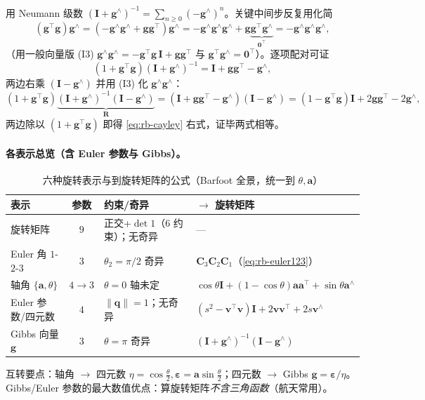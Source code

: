 \begin{derivation}
用 Neumann 级数 $(\mathbf{I}+\mathbf{g}^\wedge)^{-1}=\sum_{n\ge0}(-\mathbf{g}^\wedge)^n$。关键中间步反复用化简
\[
  (\mathbf{g}^\top\mathbf{g})\mathbf{g}^\wedge=(-\mathbf{g}^\wedge\mathbf{g}^\wedge+\mathbf{g}\mathbf{g}^\top)\mathbf{g}^\wedge
  =-\mathbf{g}^\wedge\mathbf{g}^\wedge\mathbf{g}^\wedge+\mathbf{g}\underbrace{\mathbf{g}^\top\mathbf{g}^\wedge}_{\mathbf{0}^\top}=-\mathbf{g}^\wedge\mathbf{g}^\wedge\mathbf{g}^\wedge,
\]
（用一般向量版 (I3) $\mathbf{g}^\wedge\mathbf{g}^\wedge=-\mathbf{g}^\top\mathbf{g}\,\mathbf{I}+\mathbf{g}\mathbf{g}^\top$ 与 $\mathbf{g}^\top\mathbf{g}^\wedge=\mathbf{0}^\top$）。逐项配对可证
\[
  (1+\mathbf{g}^\top\mathbf{g})(\mathbf{I}+\mathbf{g}^\wedge)^{-1}=\mathbf{I}+\mathbf{g}\mathbf{g}^\top-\mathbf{g}^\wedge,
\]
两边右乘 $(\mathbf{I}-\mathbf{g}^\wedge)$ 并用 (I3) 化 $\mathbf{g}^\wedge\mathbf{g}^\wedge$：
\[
  (1+\mathbf{g}^\top\mathbf{g})\underbrace{(\mathbf{I}+\mathbf{g}^\wedge)^{-1}(\mathbf{I}-\mathbf{g}^\wedge)}_{\mathbf{R}}
  =(\mathbf{I}+\mathbf{g}\mathbf{g}^\top-\mathbf{g}^\wedge)(\mathbf{I}-\mathbf{g}^\wedge)
  =(1-\mathbf{g}^\top\mathbf{g})\mathbf{I}+2\mathbf{g}\mathbf{g}^\top-2\mathbf{g}^\wedge,
\]
两边除以 $(1+\mathbf{g}^\top\mathbf{g})$ 即得 \cref{eq:rb-cayley} 右式，证毕两式相等。
\end{derivation}

\paragraph{各表示总览（含 Euler 参数与 Gibbs）。}
\begin{table}[H]\centering\small
\caption{六种旋转表示与到旋转矩阵的公式（Barfoot 全景，统一到 $\theta,\mathbf{a}$）}
\label{tab:rb-rep-overview}
\begin{tabular}{lcll}
\toprule
表示 & 参数 & 约束/奇异 & $\to$ 旋转矩阵 \\
\midrule
旋转矩阵 & $9$ & 正交+$\det1$（$6$ 约束）；无奇异 & --- \\
Euler 角 $1$-$2$-$3$ & $3$ & $\theta_2=\pi/2$ 奇异 & $\mathbf{C}_3\mathbf{C}_2\mathbf{C}_1$（\cref{eq:rb-euler123}）\\
轴角 $\{\mathbf{a},\theta\}$ & $4\!\to\!3$ & $\theta=0$ 轴未定 & $\cos\theta\mathbf{I}+(1-\cos\theta)\mathbf{a}\mathbf{a}^\top+\sin\theta\mathbf{a}^\wedge$ \\
Euler 参数/四元数 & $4$ & $\|\mathbf{q}\|=1$；无奇异 & $(s^2-\mathbf{v}^\top\mathbf{v})\mathbf{I}+2\mathbf{v}\mathbf{v}^\top+2s\mathbf{v}^\wedge$ \\
Gibbs 向量 $\mathbf{g}$ & $3$ & $\theta=\pi$ 奇异 & $(\mathbf{I}+\mathbf{g}^\wedge)^{-1}(\mathbf{I}-\mathbf{g}^\wedge)$ \\
\bottomrule
\end{tabular}
\end{table}
\noindent 互转要点：轴角 $\to$ 四元数 $\eta=\cos\tfrac{\theta}{2},\boldsymbol{\varepsilon}=\mathbf{a}\sin\tfrac{\theta}{2}$；四元数 $\to$ Gibbs $\mathbf{g}=\boldsymbol{\varepsilon}/\eta$。Gibbs/Euler 参数的最大数值优点：算旋转矩阵\emph{不含三角函数}（航天常用）。

